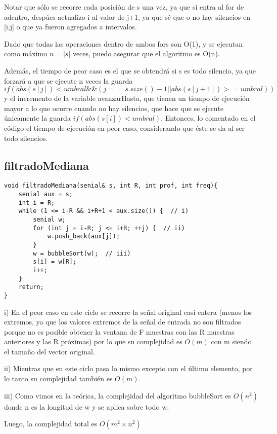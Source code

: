 \documentclass{article}
\begin{document}
Notar que sólo se recorre cada posición de s una vez, ya que si entra al for de adentro, despúes actualizo i
al valor de j+1, ya que sé que o no hay silencios en [i,j] o que ya fueron agregados a intervalos.

Dado que todas las operaciones dentro de ambos fors son O(1), y se ejecutan como máximo $n=|s|$ veces, puedo
asegurar que el algoritmo es O(n).

Además, el tiempo de peor caso es el que se obtendrá si s es todo silencio, ya que forzará a que se ejecute n
veces la guarda $if(abs(s[j]) < umbral \&\& (j == s.size()-1 || abs(s[j+1]) >= umbral))$ y el incremento de
la variable avanzarHasta, que tienen un tiempo de ejecución mayor a lo que ocurre cuando no hay silencios,
que hace que se ejecute únicamente la guarda $if(abs(s[i]) < umbral)$. Entonces, lo comentado en el código el tiempo de
ejecución en peor caso, considerando que éste se da al ser todo silencios.


\newpage
\subsection{filtradoMediana}
\begin{lstlisting}
void filtradoMediana(senial& s, int R, int prof, int freq){
    senial aux = s;
    int i = R;
    while (1 <= i-R && i+R+1 < aux.size()) {  // i)
        senial w;
        for (int j = i-R; j <= i+R; ++j) {  // ii)
            w.push_back(aux[j]);
        }
        w = bubbleSort(w);  // iii)
        s[i] = w[R];
        i++;
    }
    return;
}
\end{lstlisting}

i) En el peor caso en este ciclo se recorre la señal original casi entera (menos los extremos, ya que los valores extremos de la señal de entrada no son filtrados porque no es posible obtener la ventana de F muestras con las R muestras anteriores y las R próximas) por lo que su complejidad es $O(m)$ con m siendo el tamaño del vector original.

ii) Mientras que en este ciclo pasa lo mismo excepto con el último elemento, por lo tanto su complejidad también es $O(m)$.

iii) Como vimos en la teórica, la complejidad del algoritmo bubbleSort es $O(n^2)$ donde n es la longitud de w y se aplica sobre todo w.

Luego, la complejidad total es $O(m^2 \times n^2)$
\end{document}
